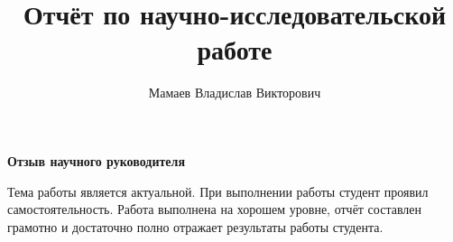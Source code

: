 \documentclass[%
bachelor,    %
subf,        %
href,        %
colorlinks,  %
]{disser}
\begin{document}

%
%



\title{Отчёт по научно-исследовательской работе}
\def\topiclabel{}

\author{Мамаев Владислав Викторович}



\date{\number\year}

\maketitle

%
%
%
%
%
%
%
%
%
%
%


\begin{center}
	\textbf{Отзыв научного руководителя}
\end{center}

Тема работы является актуальной. При выполнении работы студент проявил самостоятельность. Работа выполнена на хорошем уровне, отчёт составлен грамотно и достаточно полно отражает результаты работы студента.
\end{document}
